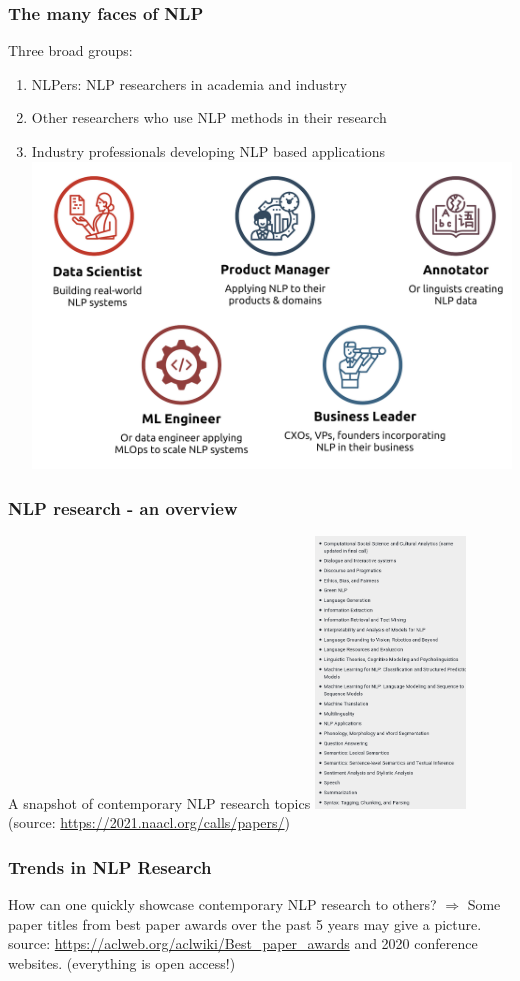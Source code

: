 \documentclass{beamer}
\begin{document}
\begin{frame}
\frametitle{The many faces of NLP}
Three broad groups: 
\begin{enumerate}
\item NLPers: NLP researchers in academia and industry
\item Other researchers who use NLP methods in their research
\item Industry professionals developing NLP based applications
\includegraphics[width=\textwidth]{figures/nlpindustry.png}
\end{enumerate}
\end{frame}

\begin{frame}
\frametitle{NLP research - an overview}
A snapshot of contemporary NLP research topics
\includegraphics[width=0.3\textwidth]{figures/naacl2021areadesc.png}
(source: \url{https://2021.naacl.org/calls/papers/})
\end{frame}

\begin{frame}
\frametitle{Trends in NLP Research}
How can one quickly showcase contemporary NLP research to others?
$\Rightarrow$ Some paper titles from best paper awards over the past 5 years may give a picture.
\\ source: \url{https://aclweb.org/aclwiki/Best_paper_awards} and 2020 conference websites.
(everything is open access!)
\end{frame}
\end{document}
